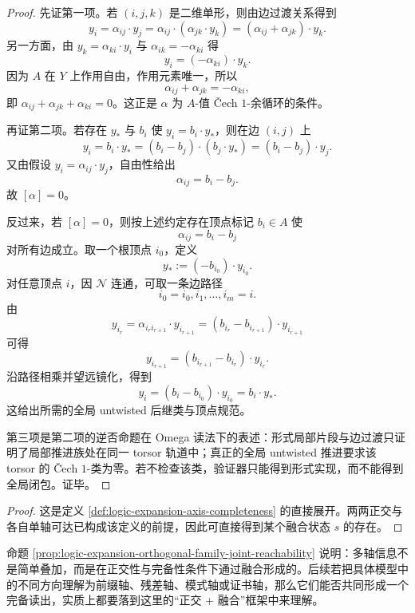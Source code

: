 \begin{proof}
先证第一项。若 \((i,j,k)\) 是二维单形，则由边过渡关系得到
\[
y_i=\alpha_{ij}\cdot y_j
      =\alpha_{ij}\cdot(\alpha_{jk}\cdot y_k)
      =(\alpha_{ij}+\alpha_{jk})\cdot y_k.
\]
另一方面，由 \(y_k=\alpha_{ki}\cdot y_i\) 与 \(\alpha_{ik}=-\alpha_{ki}\) 得
\[
y_i=(-\alpha_{ki})\cdot y_k.
\]
因为 \(A\) 在 \(Y\) 上作用自由，作用元素唯一，所以
\[
\alpha_{ij}+\alpha_{jk}=-\alpha_{ki},
\]
即 \(\alpha_{ij}+\alpha_{jk}+\alpha_{ki}=0\)。这正是 \(\alpha\) 为 \(A\)-值 \v Cech \(1\)-余循环的条件。

再证第二项。若存在 \(y_\ast\) 与 \(b_i\) 使 \(y_i=b_i\cdot y_\ast\)，则在边 \((i,j)\) 上
\[
y_i=b_i\cdot y_\ast
    =(b_i-b_j)\cdot(b_j\cdot y_\ast)
    =(b_i-b_j)\cdot y_j.
\]
又由假设 \(y_i=\alpha_{ij}\cdot y_j\)，自由性给出
\[
\alpha_{ij}=b_i-b_j.
\]
故 \([\alpha]=0\)。

反过来，若 \([\alpha]=0\)，则按上述约定存在顶点标记 \(b_i\in A\) 使
\[
\alpha_{ij}=b_i-b_j
\]
对所有边成立。取一个根顶点 \(i_0\)，定义
\[
y_\ast:=(-b_{i_0})\cdot y_{i_0}.
\]
对任意顶点 \(i\)，因 \(\mathcal N\) 连通，可取一条边路径
\[
i_0=i_0,i_1,\ldots,i_m=i.
\]
由
\[
y_{i_r}=\alpha_{i_r i_{r+1}}\cdot y_{i_{r+1}}
       =(b_{i_r}-b_{i_{r+1}})\cdot y_{i_{r+1}}
\]
可得
\[
y_{i_{r+1}}=(b_{i_{r+1}}-b_{i_r})\cdot y_{i_r}.
\]
沿路径相乘并望远镜化，得到
\[
y_i=(b_i-b_{i_0})\cdot y_{i_0}=b_i\cdot y_\ast.
\]
这给出所需的全局 untwisted 后继类与顶点规范。

第三项是第二项的逆否命题在 Omega 读法下的表述：形式局部片段与边过渡只证明了局部推进族处在同一 torsor 轨道中；真正的全局 untwisted 推进要求该 torsor 的 \v Cech \(1\)-类为零。若不检查该类，验证器只能得到形式实现，而不能得到全局闭包。证毕。
\end{proof}

\begin{proof}
这是定义 \ref{def:logic-expansion-axis-completeness} 的直接展开。两两正交与各自单轴可达已构成该定义的前提，因此可直接得到某个融合状态 \(s\) 的存在。
\end{proof}

命题 \ref{prop:logic-expansion-orthogonal-family-joint-reachability} 说明：多轴信息不是简单叠加，而是在正交性与完备性条件下通过融合形成的。后续若把具体模型中的不同方向理解为前缀轴、残差轴、模式轴或证书轴，那么它们能否共同形成一个完备读出，实质上都要落到这里的“正交 + 融合”框架中来理解。


